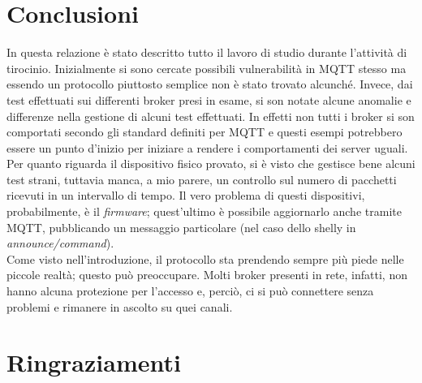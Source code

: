 \documentclass[binding=0.6cm,TFA]{sapthesis}
\begin{document}
\chapter{Conclusioni}

\begin{large}
In questa relazione è stato descritto tutto il lavoro di studio durante l'attività di tirocinio. Inizialmente si sono cercate possibili vulnerabilità in MQTT stesso ma essendo un protocollo piuttosto semplice non è stato trovato alcunché. Invece, dai test effettuati sui differenti broker presi in esame, si son notate alcune anomalie e differenze nella gestione di alcuni test effettuati. In effetti non tutti i broker si son comportati secondo gli standard definiti per MQTT e questi esempi potrebbero essere un punto d'inizio per iniziare a rendere i comportamenti dei server uguali. \\
Per quanto riguarda il dispositivo fisico provato, si è visto che gestisce bene alcuni test strani, tuttavia manca, a mio parere, un controllo sul numero di pacchetti ricevuti in un intervallo di tempo. Il vero problema di questi dispositivi, probabilmente, è il \textit{firmware}; quest'ultimo è possibile aggiornarlo anche tramite MQTT, pubblicando un messaggio particolare (nel caso dello shelly in \textit{announce/command}). \\
Come visto nell'introduzione, il protocollo sta prendendo sempre più piede nelle piccole realtà; questo può preoccupare. Molti broker presenti in rete, infatti, non hanno alcuna protezione per l'accesso e, perciò, ci si può connettere senza problemi e rimanere in ascolto su quei canali.
\end{large}

\chapter*{Ringraziamenti}

\cleardoublepage
{}
\end{document}
